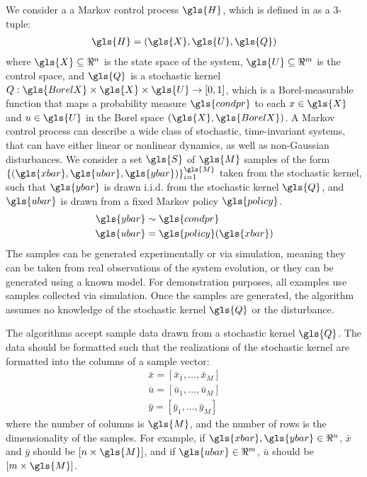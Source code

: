 \documentclass[11pt]{article}
\begin{document}
We consider a a Markov control process $\gls{H}$, which is defined in \cite{summers} as a 3-tuple:
\begin{align}
  \gls{H} = (\gls{X}, \gls{U}, \gls{Q})
\end{align}
where $\gls{X} \subseteq \Re^{n}$ is the state space of the system, $\gls{U} \subseteq \Re^{m}$ is the control space, and $\gls{Q}$ is a stochastic kernel
$Q : \gls{BorelX} \times \gls{X} \times \gls{U} \rightarrow [0, 1]$, which is a Borel-measurable function that maps a probability measure $\gls{condpr}$ to each $x \in \gls{X}$ and $u \in \gls{U}$ in the Borel space $(\gls{X}, \gls{BorelX})$.
A Markov control process can describe a wide class of stochastic, time-invariant systems, that can have either linear or nonlinear dynamics, as well as non-Gaussian disturbances.
%
We consider a set $\gls{S}$ of $\gls{M}$ samples of the form
$\lbrace (\gls{xbar}, \gls{ubar}, \gls{ybar}) \rbrace_{i=1}^{\gls{M}}$ taken from the stochastic kernel,
such that $\gls{ybar}$ is drawn i.i.d. from the stochastic kernel $\gls{Q}$,
and $\gls{ubar}$ is drawn from a fixed Markov policy $\gls{policy}$.
\begin{align}
	\gls{ybar} &\sim \gls{condpr} \\
	\gls{ubar} &= \gls{policy}(\gls{xbar})
\end{align}
The samples can be generated experimentally or via simulation, meaning they can be taken from real observations of the system evolution, or they can be generated using a known model. For demonstration purposes, all examples use samples collected via simulation.
%
Once the samples are generated, the algorithm assumes no knowledge of the stochastic kernel $\gls{Q}$ or the disturbance.

The algorithms accept sample data drawn from a stochastic kernel $\gls{Q}$. The data should be formatted such that the realizations of the stochastic kernel are formatted into the columns of a sample vector:
\begin{align}
  \bar{x} = [\bar{x}_{1}, \ldots, \bar{x}_{M}] \\
  \bar{u} = [\bar{u}_{1}, \ldots, \bar{u}_{M}] \\
  \bar{y} = [\bar{y}_{1}, \ldots, \bar{y}_{M}]
\end{align}
where the number of columns is $\gls{M}$, and the number of rows is the dimensionality of the samples. For example, if $\gls{xbar}, \gls{ybar} \in \Re^{n}$, $\bar{x}$ and $\bar{y}$ should be $[n \times \gls{M}]$, and if $\gls{ubar} \in \Re^{m}$, $\bar{u}$ should be $[m \times \gls{M}]$.
\end{document}
